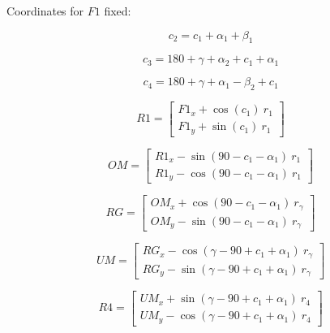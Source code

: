 \documentclass[10pt,a4paper]{article}
\begin{document}
\clearpage
\begin{multicols}{2}

Coordinates for $F1$ fixed:

\begin{equation}
c_2 = c_1 + \alpha_1 + \beta_1
\label{eq:F1_start}
\end{equation}

\begin{equation}
c_3 = 180 + \gamma + \alpha_2 + c_1 + \alpha_1
\end{equation}

\begin{equation}
c_4 = 180 + \gamma + \alpha_1 - \beta_2 + c_1
\end{equation}


\begin{equation}
R1 =  \begin{bmatrix} 
F1_x +\cos(c_1)~r_1 \\ 
F1_y + \sin(c_1)~r_1\end{bmatrix}
\end{equation}

\begin{equation}
OM =  \begin{bmatrix} 
R1_x - \sin(90-c_1-\alpha_1)~r_1 \\ 
R1_y - \cos(90-c_1-\alpha_1)~r_1 \end{bmatrix}
\end{equation}

\begin{equation}
RG =  \begin{bmatrix} 
OM_x + \cos(90-c_1-\alpha_1)~r_\gamma \\ 
OM_y - \sin(90-c_1-\alpha_1)~r_\gamma \end{bmatrix}
\end{equation}

\begin{equation}
UM =  \begin{bmatrix} 
RG_x - \cos(\gamma - 90 + c_1 + \alpha_1)~r_\gamma \\ 
RG_y - \sin(\gamma - 90 + c_1 + \alpha_1)~r_\gamma \end{bmatrix}
\end{equation}

\begin{equation}
R4 =  \begin{bmatrix} 
UM_x + \sin(\gamma - 90 + c_1 + \alpha_1)~r_4 \\
UM_y - \cos(\gamma - 90 + c_1 + \alpha_1)~r_4 \end{bmatrix}
\end{equation}


\end{multicols}
\end{document}
